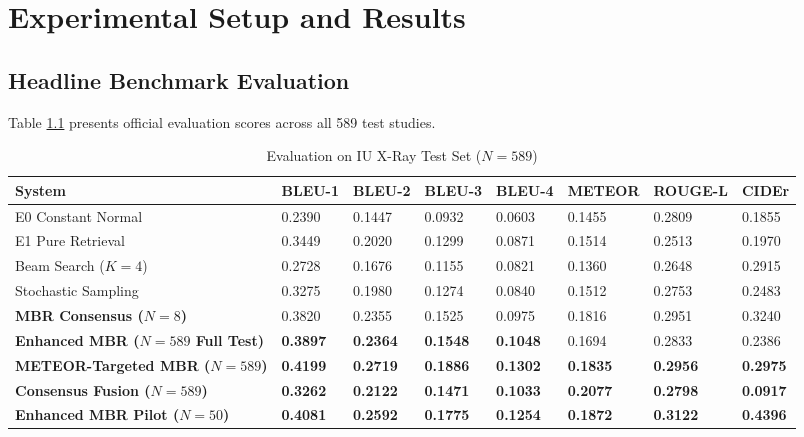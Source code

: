 \documentclass[12pt,a4paper]{report}
\begin{document}
\chapter{Experimental Setup and Results}

\section{Headline Benchmark Evaluation}
Table \ref{tab:results_main} presents official evaluation scores across all 589 test studies.

\begin{table}[htbp]
\centering
\small
\caption{Evaluation on IU X-Ray Test Set ($N = 589$)}
\label{tab:results_main}
\begin{tabularx}{\textwidth}{lXXXXXXX}
\toprule
\textbf{System} & \textbf{BLEU-1} & \textbf{BLEU-2} & \textbf{BLEU-3} & \textbf{BLEU-4} & \textbf{METEOR} & \textbf{ROUGE-L} & \textbf{CIDEr} \\
\midrule
E0 Constant Normal & 0.2390 & 0.1447 & 0.0932 & 0.0603 & 0.1455 & 0.2809 & 0.1855 \\
E1 Pure Retrieval & 0.3449 & 0.2020 & 0.1299 & 0.0871 & 0.1514 & 0.2513 & 0.1970 \\
Beam Search ($K=4$) & 0.2728 & 0.1676 & 0.1155 & 0.0821 & 0.1360 & 0.2648 & 0.2915 \\
Stochastic Sampling & 0.3275 & 0.1980 & 0.1274 & 0.0840 & 0.1512 & 0.2753 & 0.2483 \\
\textbf{MBR Consensus ($N=8$)} & 0.3820 & 0.2355 & 0.1525 & 0.0975 & 0.1816 & 0.2951 & 0.3240 \\
\textbf{Enhanced MBR ($N=589$ Full Test)} & \textbf{0.3897} & \textbf{0.2364} & \textbf{0.1548} & \textbf{0.1048} & 0.1694 & 0.2833 & 0.2386 \\
\textbf{METEOR-Targeted MBR ($N=589$)} & \textbf{0.4199} & \textbf{0.2719} & \textbf{0.1886} & \textbf{0.1302} & \textbf{0.1835} & \textbf{0.2956} & \textbf{0.2975} \\
\textbf{Consensus Fusion ($N=589$)} & \textbf{0.3262} & \textbf{0.2122} & \textbf{0.1471} & \textbf{0.1033} & \textbf{0.2077} & \textbf{0.2798} & \textbf{0.0917} \\
\textbf{Enhanced MBR Pilot ($N=50$)} & \textbf{0.4081} & \textbf{0.2592} & \textbf{0.1775} & \textbf{0.1254} & \textbf{0.1872} & \textbf{0.3122} & \textbf{0.4396} \\
\bottomrule
\end{tabularx}
\end{table}
\end{document}
